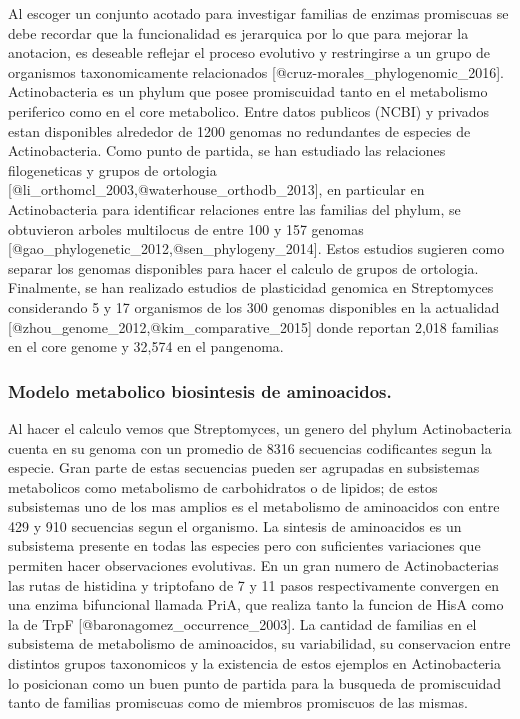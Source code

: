 \documentclass[]{article}
\begin{document}
Al escoger un conjunto acotado para investigar familias de enzimas
promiscuas se debe recordar que la funcionalidad es jerarquica por lo
que para mejorar la anotacion, es deseable reflejar el proceso evolutivo
y restringirse a un grupo de organismos taxonomicamente relacionados
{[}@cruz-morales\_phylogenomic\_2016{]}. Actinobacteria es un phylum que
posee promiscuidad tanto en el metabolismo periferico como en el core
metabolico. Entre datos publicos (NCBI) y privados estan disponibles
alrededor de 1200 genomas no redundantes de especies de Actinobacteria.
Como punto de partida, se han estudiado las relaciones filogeneticas y
grupos de ortologia
{[}@li\_orthomcl\_2003,@waterhouse\_orthodb\_2013{]}, en particular en
Actinobacteria para identificar relaciones entre las familias del
phylum, se obtuvieron arboles multilocus de entre 100 y 157 genomas
{[}@gao\_phylogenetic\_2012,@sen\_phylogeny\_2014{]}. Estos estudios
sugieren como separar los genomas disponibles para hacer el calculo de
grupos de ortologia. Finalmente, se han realizado estudios de
plasticidad genomica en Streptomyces considerando 5 y 17 organismos de
los 300 genomas disponibles en la actualidad
{[}@zhou\_genome\_2012,@kim\_comparative\_2015{]} donde reportan 2,018
familias en el core genome y 32,574 en el pangenoma.

\subsubsection{Modelo metabolico biosintesis de
aminoacidos.}\label{modelo-metabolico-biosintesis-de-aminoacidos.}

Al hacer el calculo vemos que Streptomyces, un genero del phylum
Actinobacteria cuenta en su genoma con un promedio de 8316 secuencias
codificantes segun la especie. Gran parte de estas secuencias pueden ser
agrupadas en subsistemas metabolicos como metabolismo de carbohidratos o
de lipidos; de estos subsistemas uno de los mas amplios es el
metabolismo de aminoacidos con entre 429 y 910 secuencias segun el
organismo. La sintesis de aminoacidos es un subsistema presente en todas
las especies pero con suficientes variaciones que permiten hacer
observaciones evolutivas. En un gran numero de Actinobacterias las rutas
de histidina y triptofano de 7 y 11 pasos respectivamente convergen en
una enzima bifuncional llamada PriA, que realiza tanto la funcion de
HisA como la de TrpF {[}@baronagomez\_occurrence\_2003{]}. La cantidad
de familias en el subsistema de metabolismo de aminoacidos, su
variabilidad, su conservacion entre distintos grupos taxonomicos y la
existencia de estos ejemplos en Actinobacteria lo posicionan como un
buen punto de partida para la busqueda de promiscuidad tanto de familias
promiscuas como de miembros promiscuos de las mismas.
\end{document}
